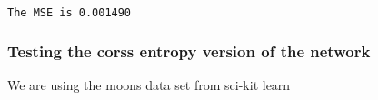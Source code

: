 \documentclass[11pt]{article}
\begin{document}
    \begin{center}
    \end{center}
    { \hspace*{\fill} \\}
    
    \begin{Verbatim}[commandchars=\\\{\}]
The MSE is 0.001490

    \end{Verbatim}

    \subsubsection{Testing the corss entropy version of the
network}\label{testing-the-corss-entropy-version-of-the-network}

We are using the moons data set from sci-kit learn
\end{document}
